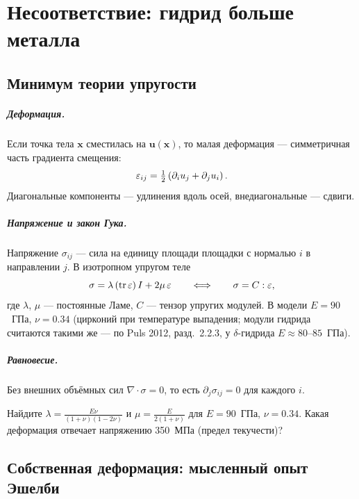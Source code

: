 \chapter{Несоответствие: гидрид больше металла}\label{ch:misfit}

\section{Минимум теории упругости}

\paragraph{Деформация.} Если точка тела $\mathbf x$ сместилась на $\mathbf u(\mathbf x)$, то
малая деформация --- симметричная часть градиента смещения:
\begin{equation}
\varepsilon_{ij}=\tfrac12\left(\partial_i u_j+\partial_j u_i\right).
\end{equation}
Диагональные компоненты --- удлинения вдоль осей, внедиагональные --- сдвиги.

\paragraph{Напряжение и закон Гука.} Напряжение $\sigma_{ij}$ --- сила на единицу площади
площадки с нормалью $i$ в направлении $j$. В изотропном упругом теле
\begin{equation}
\sigma=\lambda\,(\mathrm{tr}\,\varepsilon)\,I+2\mu\,\varepsilon\qquad\Longleftrightarrow\qquad\sigma=C:\varepsilon,
\end{equation}
где $\lambda$, $\mu$ --- постоянные Ламе, $C$ --- тензор упругих модулей. В модели $E=90$~ГПа,
$\nu=0.34$ (цирконий при температуре выпадения; модули гидрида считаются такими же ---
по Puls 2012, разд.~2.2.3, у $\delta$-гидрида $E\approx80$--$85$~ГПа).

\paragraph{Равновесие.} Без внешних объёмных сил $\nabla\cdot\sigma=0$, то есть
$\partial_j\sigma_{ij}=0$ для каждого $i$.

\begin{exercise}
Найдите $\lambda=\frac{E\nu}{(1+\nu)(1-2\nu)}$ и $\mu=\frac{E}{2(1+\nu)}$ для $E=90$~ГПа, $\nu=0.34$.
Какая деформация отвечает напряжению 350~МПа (предел текучести)?
\end{exercise}

\section{Собственная деформация: мысленный опыт Эшелби}

